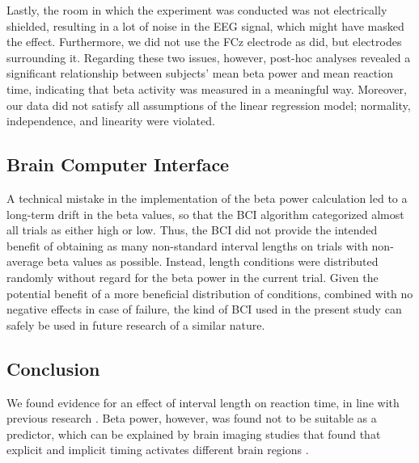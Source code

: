 \documentclass[man,floatsintext]{apa6} %
\begin{document}
Lastly, the room in which the experiment was conducted was not
electrically shielded, resulting in a lot of noise in the EEG signal,
which might have masked the effect. Furthermore, we did not use the
FCz electrode as  did, but electrodes
surrounding it. Regarding these two issues, however, post-hoc analyses
revealed a significant relationship between subjects' mean beta power
and mean reaction time, indicating that beta activity was measured in
a meaningful way. Moreover, our data did not satisfy all assumptions
of the linear regression model; normality, independence, and linearity
were violated.

\subsection{Brain Computer Interface}
A technical mistake in the implementation of the beta power
calculation led to a long-term drift in the beta values, so that the
BCI algorithm categorized almost all trials as either high or
low. Thus, the BCI did not provide the intended benefit of obtaining
as many non-standard interval lengths on trials with non-average beta
values as possible. Instead, length conditions were distributed
randomly without regard for the beta power in the current trial.
Given the potential benefit of a more beneficial distribution of
conditions, combined with no negative effects in case of failure, the
kind of BCI used in the present study can safely be used in future
research of a similar nature.

\subsection{Conclusion}
We found evidence for an effect of interval length on reaction time,
in line with previous research \cite{naatanen_diminishing_1970,
  karlin_reaction_1959, drazin_effects_1961,
  grosjean_timing_2001}. Beta power, however, was found not to be
suitable as a predictor, which can be explained by brain imaging
studies that found that explicit and implicit timing activates
different brain regions \cite{coull_dissociating_2008}.



\end{document}
